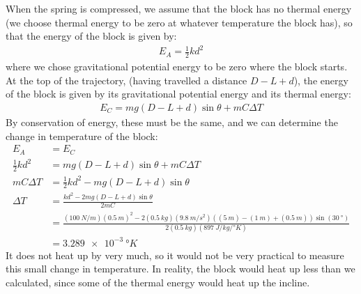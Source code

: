 \begin{solution}
\begin{parts}
		When the spring is compressed, we assume that the block has no thermal energy (we choose thermal energy to be zero at whatever temperature the block has), so that the energy of the block is given by:
		\begin{align*}
		E_A=\frac{1}{2}kd^2
		\end{align*}
		where we chose gravitational potential energy to be zero where the block starts. At the top of the trajectory, (having travelled a distance $D-L+d$), the energy of the block is given by its gravitational potential energy and its thermal energy:
		\begin{align*}
		E_C=mg(D-L+d)\sin\theta+mC\Delta T
		\end{align*}
		By conservation of energy, these must be the same, and we can determine the change in temperature of the block:
		\begin{align*}
		E_A &= E_C\\
		\frac{1}{2}kd^2 &= mg(D-L+d)\sin\theta+mC\Delta T\\
		mC\Delta T &=\frac{1}{2}kd^2-mg(D-L+d)\sin\theta\\
		\Delta T &= \frac{kd^2-2mg(D-L+d)\sin\theta}{2mC}\\
		&= \frac{(\SI{100}{N/m})(\SI{0.5}{m})^2-2(\SI{0.5}{kg})(\SI{9.8}{m/s^2})((\SI{5}{m})-(\SI{1}{m})+(\SI{0.5}{m}))\sin(\SI{30}{\degree})}{2(\SI{0.5}{kg})(\SI{897}{J/kg/\degree K})}\\
		&=\SI{3.289e-3}{\degree K}
		\end{align*}
		It does not heat up by very much, so it would not be very practical to measure this small change in temperature. In reality, the block would heat up less than we calculated, since some of the thermal energy would heat up the incline.
	\end{parts}
\end{solution}

